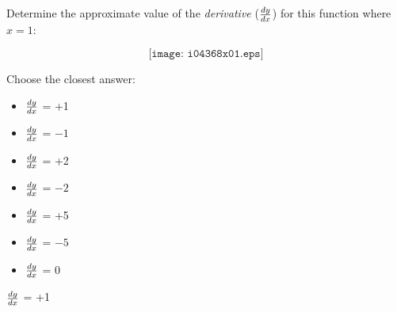 

Determine the approximate value of the {\it derivative} ($dy \over dx$) for this function where $x=1$:

$$\texttt{[image: i04368x01.eps]}$$

Choose the closest answer:

\begin{itemize}
\item{} $dy \over dx$ = +1
\vskip 10pt 
\item{} $dy \over dx$ = $-1$
\vskip 10pt 
\item{} $dy \over dx$ = +2
\vskip 10pt 
\item{} $dy \over dx$ = $-2$
\vskip 10pt 
\item{} $dy \over dx$ = +5
\vskip 10pt 
\item{} $dy \over dx$ = $-5$
\vskip 10pt 
\item{} $dy \over dx$ = 0
\end{itemize}







$dy \over dx$ = +1











